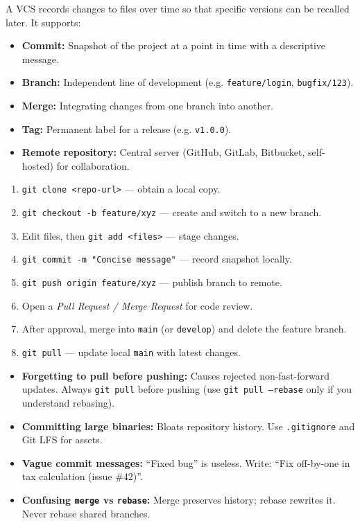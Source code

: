 \documentclass[11pt]{article}
\begin{document}
\begin{definition}
A VCS records changes to files over time so that specific versions can be recalled later. It supports:
\begin{itemize}
\item \textbf{Commit:} Snapshot of the project at a point in time with a descriptive message.
\item \textbf{Branch:} Independent line of development (e.g. \texttt{feature/login}, \texttt{bugfix/123}).
\item \textbf{Merge:} Integrating changes from one branch into another.
\item \textbf{Tag:} Permanent label for a release (e.g. \texttt{v1.0.0}).
\item \textbf{Remote repository:} Central server (GitHub, GitLab, Bitbucket, self-hosted) for collaboration.
\end{itemize}
\end{definition}

\begin{methode}
\begin{enumerate}
\item \texttt{git clone <repo-url>} — obtain a local copy.
\item \texttt{git checkout -b feature/xyz} — create and switch to a new branch.
\item Edit files, then \texttt{git add <files>} — stage changes.
\item \texttt{git commit -m "Concise message"} — record snapshot locally.
\item \texttt{git push origin feature/xyz} — publish branch to remote.
\item Open a \emph{Pull Request / Merge Request} for code review.
\item After approval, merge into \texttt{main} (or \texttt{develop}) and delete the feature branch.
\item \texttt{git pull} — update local \texttt{main} with latest changes.
\end{enumerate}
\end{methode}

\begin{attention}
\begin{itemize}
\item \textbf{Forgetting to pull before pushing:} Causes rejected non-fast-forward updates. Always \texttt{git pull} before pushing (use \texttt{git pull --rebase} only if you understand rebasing).
\item \textbf{Committing large binaries:} Bloats repository history. Use \texttt{.gitignore} and Git LFS for assets.
\item \textbf{Vague commit messages:} ``Fixed bug'' is useless. Write: ``Fix off-by-one in tax calculation (issue \#42)''.
\item \textbf{Confusing \texttt{merge} vs \texttt{rebase}:} Merge preserves history; rebase rewrites it. Never rebase shared branches.
\end{itemize}
\end{attention}
\end{document}
